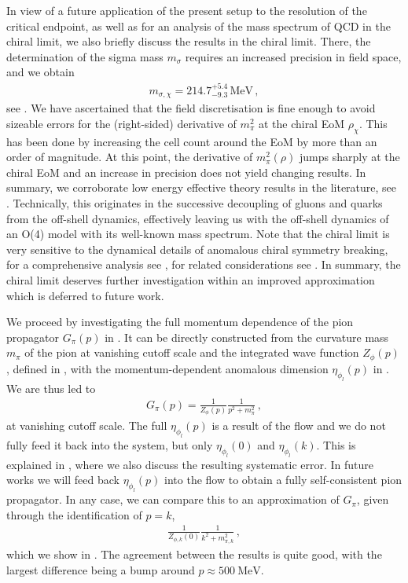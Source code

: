\documentclass[aps,twocolumn,prd,superscriptaddress]{revtex4-2}
\begin{document}
In view of a future application of the present setup to the resolution of the critical endpoint, as well as for an analysis of the mass spectrum of QCD in the chiral limit, we also briefly discuss the results in the chiral limit. There, the determination of the sigma mass $m_\sigma$ requires an increased precision in field space, and we obtain 
%
\begin{align}
	m_{\sigma,\chi}= 214.7^{+5.4}_{-9.3}\,\textrm{MeV}	\,,
	\label{eq:msigmachi}
\end{align}
%
see . We have ascertained that the field discretisation is fine enough to avoid sizeable errors for the (right-sided) derivative of $m_\pi^2$ at the chiral EoM $\rho_\chi$. This has been done by increasing the cell count around the EoM by more than an order of magnitude. At this point, the derivative of $m^2_\pi(\rho)$ jumps sharply at the chiral EoM and an increase in precision does not yield changing results. In summary, we corroborate low energy effective theory results in the literature, see \cite{Dupuis:2020fhh}. Technically, this originates in the successive decoupling of gluons and quarks from the off-shell dynamics, effectively leaving us with the off-shell dynamics of an O(4) model with its well-known mass spectrum. Note that the chiral limit is very sensitive to the dynamical details of anomalous chiral symmetry breaking, for a comprehensive analysis see \cite{Resch:2017vjs, Pisarski:2024esv}, for related considerations see \cite{Zwicky:2023krx}. In summary, the chiral limit deserves further investigation within an improved approximation which is deferred to future work. 

We proceed by investigating the full momentum dependence of the pion propagator $G_\pi(p)$ in . It can be directly constructed from the curvature mass $m_\pi$ of the pion at vanishing cutoff scale and the integrated wave function $Z_\phi(p)$, defined in , with the momentum-dependent anomalous dimension $\eta_{\phi_l}(p)$ in .
We are thus led to 
%
\begin{align}
	G_\pi(p) = \frac{1}{Z_\phi(p)}\frac{1}{p^2+m^2_\pi}\,, 
	\label{eq:Gpi}
\end{align}
% 
at vanishing cutoff scale. The full $\eta_{\phi_l}(p)$ is a result of the flow and we do not fully feed it back into the system, but only $\eta_{\phi_l}(0)$ and $\eta_{\phi_l}(k)$. This is explained in , where we also discuss the resulting systematic error. In future works we will feed back $\eta_{\phi_l}(p)$ into the flow to obtain a fully self-consistent pion propagator. In any case, we can compare this to an approximation of $G_\pi$, given through the identification of $p=k$,
%
\begin{align}\label{eq:Gpik}
	\frac{1}{Z_{\phi,k}(0)}\frac{1}{k^2 + m_{\pi,k}^2}\,,
\end{align}
%
which we show in . The agreement between the results is quite good, with the largest difference being a bump around $p \approx \qty{500}{\MeV}$.
\end{document}
